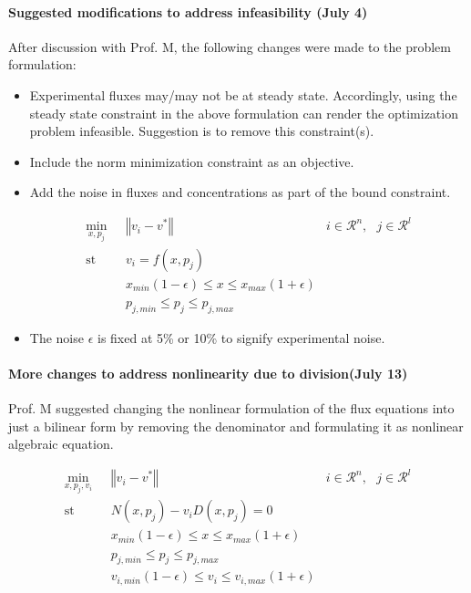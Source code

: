 \documentclass[10pt]{report}
\begin{document}
	\paragraph{Suggested modifications to address infeasibility (July 4)}
	After discussion with Prof. M, the following changes were made to the problem formulation:
	\begin{itemize}
		\item Experimental fluxes may/may not be at steady state. Accordingly, using the steady state constraint in the above formulation can render the optimization problem infeasible. Suggestion is to remove this constraint(s).
		\item Include the norm minimization constraint as an objective.
		\item Add the noise in fluxes and concentrations as part of the bound constraint.
		\begin{center}
			\begin{subequations}
				\begin{align}
				\underset{x,p_j}{\mathrm{min}} & \text{      }\left\Vert v_i-v^*\right\Vert &  i\in\mathcal{R}^n,\text{  }j\in\mathcal{R}^l\\
				\mathrm{st}& \text{      }v_i = f(x,p_j)\\
				& \text{      }x_{min}(1-\epsilon)\le x \le x_{max}(1+\epsilon)\\
				& \text{      }p_{j,min} \le p_j \le p_{j,max}
				\end{align}
			\end{subequations}
		\end{center}
	\item The noise $\epsilon$ is fixed at 5\% or 10\% to signify experimental noise.
	\end{itemize}

	\paragraph{More changes to address nonlinearity due to division(July 13)}
	Prof. M suggested changing the nonlinear formulation of the flux equations into just a bilinear form by removing the denominator and formulating it as nonlinear algebraic equation.
	\begin{center}
		\begin{subequations}
			\begin{align}
			\underset{x,p_j,v_i}{\mathrm{min}} & \text{      }\left\Vert v_i-v^*\right\Vert &  i\in\mathcal{R}^n,\text{  }j\in\mathcal{R}^l\\
			\mathrm{st}& \text{      }N(x,p_j) - v_iD(x,p_j) = 0\\
			& \text{      }x_{min}(1-\epsilon)\le x \le x_{max}(1+\epsilon)\\			
			& \text{      }p_{j,min} \le p_j \le p_{j,max}\\
			& \text{      }v_{i,min}(1-\epsilon)\le v_i \le v_{i,max}(1+\epsilon)
			\end{align}
		\end{subequations}
	\end{center}
\end{document}
